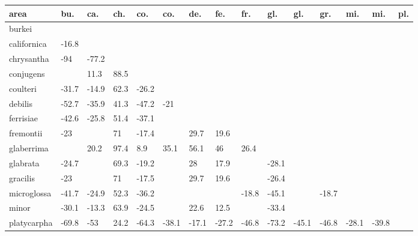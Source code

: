 \begin{table}[ht]
\centering
\begin{tabular}{lllllllllllllll}
  \hline
area & bu. & ca. & ch. & co. & co. & de. & fe. & fr. & gl. & gl. & gr. & mi. & mi. & pl. \\ 
  \hline
burkei &  &  &  &  &  &  &  &  &  &  &  &  &  &  \\ 
  californica & -16.8 &  &  &  &  &  &  &  &  &  &  &  &  &  \\ 
  chrysantha & -94 & -77.2 &  &  &  &  &  &  &  &  &  &  &  &  \\ 
  conjugens &  & 11.3 & 88.5 &  &  &  &  &  &  &  &  &  &  &  \\ 
  coulteri & -31.7 & -14.9 & 62.3 & -26.2 &  &  &  &  &  &  &  &  &  &  \\ 
  debilis & -52.7 & -35.9 & 41.3 & -47.2 & -21 &  &  &  &  &  &  &  &  &  \\ 
  ferrisiae & -42.6 & -25.8 & 51.4 & -37.1 &  &  &  &  &  &  &  &  &  &  \\ 
  fremontii & -23 &  & 71 & -17.4 &  & 29.7 & 19.6 &  &  &  &  &  &  &  \\ 
  glaberrima &  & 20.2 & 97.4 & 8.9 & 35.1 & 56.1 & 46 & 26.4 &  &  &  &  &  &  \\ 
  glabrata & -24.7 &  & 69.3 & -19.2 &  & 28 & 17.9 &  & -28.1 &  &  &  &  &  \\ 
  gracilis & -23 &  & 71 & -17.5 &  & 29.7 & 19.6 &  & -26.4 &  &  &  &  &  \\ 
  microglossa & -41.7 & -24.9 & 52.3 & -36.2 &  &  &  & -18.8 & -45.1 &  & -18.7 &  &  &  \\ 
  minor & -30.1 & -13.3 & 63.9 & -24.5 &  & 22.6 & 12.5 &  & -33.4 &  &  &  &  &  \\ 
  platycarpha & -69.8 & -53 & 24.2 & -64.3 & -38.1 & -17.1 & -27.2 & -46.8 & -73.2 & -45.1 & -46.8 & -28.1 & -39.8 &  \\ 
   \hline
\end{tabular}
\end{table}
